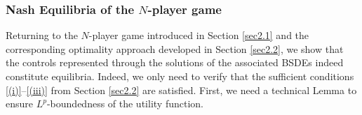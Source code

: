 \documentclass[10pt,a4paper]{article}
\theoremstyle{plain}
\theoremstyle{definition}
\numberwithin{equation}{section}
\begin{document}

\subsubsection[Nash Equilibria of the N-player game]{Nash Equilibria of the $N$-player game}
\label{sec4.1.2}

Returning to the \(N\)-player game introduced in Section \ref{sec2.1} and the corresponding optimality approach developed in Section \ref{sec2.2}, we show that the controls represented through the solutions of the associated BSDEs indeed constitute equilibria. Indeed, we only need to verify that the sufficient conditions \eqref{(i)}--\eqref{(iii)} from Section \ref{sec2.2} are satisfied. 
First, we need a technical Lemma to ensure $L^{p}$-boundedness of the utility function.
\end{document}
